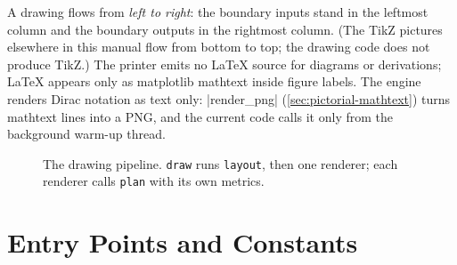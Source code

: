 A drawing flows from \emph{left to right}: the boundary inputs stand in the leftmost column and
the boundary outputs in the rightmost column. (The TikZ pictures elsewhere in this manual flow
from bottom to top; the drawing code does not produce TikZ.) The printer emits no LaTeX source
for diagrams or derivations; LaTeX appears only as matplotlib mathtext inside figure labels.
The engine renders Dirac notation as text only: \py|render_png|
(\cref{sec:pictorial-mathtext}) turns mathtext lines into a PNG, and the current code calls it
only from the background warm-up thread.

\begin{figure}[ht]
\centering
{}
\caption{The drawing pipeline. \texttt{draw} runs \texttt{layout}, then one renderer; each
renderer calls \texttt{plan} with its own metrics.}
\label{fig:pictorial-pipeline}
\end{figure}

\section{Entry Points and Constants}\label{sec:pictorial-entry}

